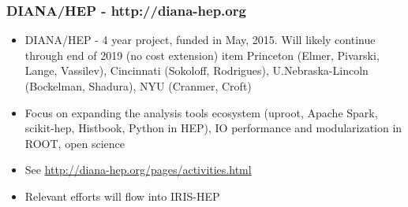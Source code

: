 \begin{frame}
\frametitle{DIANA/HEP - http://diana-hep.org}

\begin{itemize}
\item DIANA/HEP - 4 year project, funded in May, 2015. Will likely continue through end of 2019 (no cost extension)
item Princeton (Elmer, Pivarski, Lange, Vassilev), Cincinnati (Sokoloff, Rodrigues), U.Nebraska-Lincoln (Bockelman, Shadura), NYU (Cranmer, Croft)
\item Focus on expanding the analysis tools ecosystem (uproot, Apache Spark, scikit-hep, Histbook, Python in HEP), IO performance and modularization in ROOT, open science 
\item See \url{http://diana-hep.org/pages/activities.html}
\item Relevant efforts will flow into IRIS-HEP
\end{itemize}

\end{frame}


